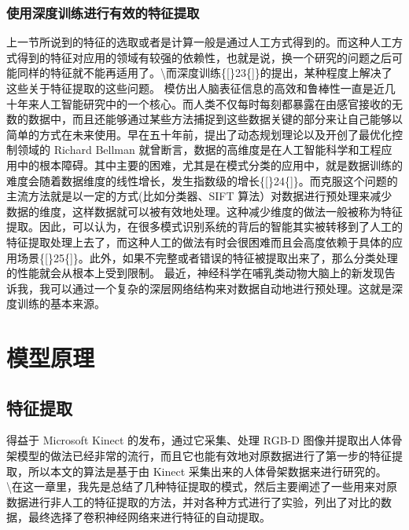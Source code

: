 \subsubsection{使用深度训练进行有效的特征提取}\label{ux4f7fux7528ux6df1ux5ea6ux8badux7ec3ux8fdbux884cux6709ux6548ux7684ux7279ux5f81ux63d0ux53d6}

上一节所说到的特征的选取或者是计算一般是通过人工方式得到的。而这种人工方式得到的特征对应用的领域有较强的依赖性，也就是说，换一个研究的问题之后可能同样的特征就不能再适用了。\textbackslash{}而深度训练\{{[}\}23\{{]}\}的提出，某种程度上解决了这些关于特征提取的这些问题。
模仿出人脑表征信息的高效和鲁棒性一直是近几十年来人工智能研究中的一个核心。而人类不仅每时每刻都暴露在由感官接收的无数的数据中，而且还能够通过某些方法捕捉到这些数据关键的部分来让自己能够以简单的方式在未来使用。早在五十年前，提出了动态规划理论以及开创了最优化控制领域的
Richard Bellman
就曾断言，数据的高维度是在人工智能科学和工程应用中的根本障碍。其中主要的困难，尤其是在模式分类的应用中，就是数据训练的难度会随着数据维度的线性增长，发生指数级的增长\{{[}\}24\{{]}\}。而克服这个问题的主流方法就是以一定的方式(比如分类器、SIFT
算法）对数据进行预处理来减少数据的维度，这样数据就可以被有效地处理。这种减少维度的做法一般被称为特征提取。因此，可以认为，在很多模式识别系统的背后的智能其实被转移到了人工的特征提取处理上去了，而这种人工的做法有时会很困难而且会高度依赖于具体的应用场景\{{[}\}25\{{]}\}。此外，如果不完整或者错误的特征被提取出来了，那么分类处理的性能就会从根本上受到限制。
最近，神经科学在哺乳类动物大脑上的新发现告诉我，我可以通过一个复杂的深层网络结构来对数据自动地进行预处理。这就是深度训练的基本来源。

\section{模型原理}\label{ux6a21ux578bux539fux7406}

\subsection{特征提取}\label{ux7279ux5f81ux63d0ux53d6}

得益于 Microsoft Kinect 的发布，通过它采集、处理 RGB-D
图像并提取出人体骨架模型的做法已经非常的流行，而且它也能有效地对原数据进行了第一步的特征提取，所以本文的算法是基于由
Kinect
采集出来的人体骨架数据来进行研究的。\textbackslash{}在这一章里，我先是总结了几种特征提取的模式，然后主要阐述了一些用来对原数据进行非人工的特征提取的方法，并对各种方式进行了实验，列出了对比的数据，最终选择了卷积神经网络来进行特征的自动提取。

